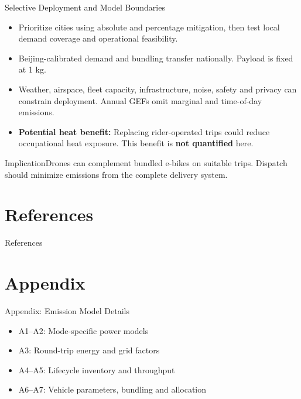 \documentclass[9pt]{beamer}
\begin{document}
\begin{frame}{Selective Deployment and Model Boundaries}
\begin{itemize}
  \item Prioritize cities using absolute and percentage mitigation, then test local demand coverage and operational feasibility.
  \item Beijing-calibrated demand and bundling transfer nationally. Payload is fixed at 1 kg.
  \item Weather, airspace, fleet capacity, infrastructure, noise, safety and privacy can constrain deployment. Annual GEFs omit marginal and time-of-day emissions.
  \item \textbf{Potential heat benefit:} Replacing rider-operated trips could reduce occupational heat exposure. This benefit is \textbf{not quantified} here.
\end{itemize}
\begin{block}{Implication}Drones can complement bundled e-bikes on suitable trips. Dispatch should minimize emissions from the complete delivery system.\end{block}
\end{frame}

\section{References}

\begin{frame}[allowframebreaks]{References}
  \printbibliography
\end{frame}


\appendix
\AtBeginSection[]{}
\section*{Appendix}
\begin{frame}{Appendix: Emission Model Details}
\begin{itemize}
\item A1--A2: Mode-specific power models
\item A3: Round-trip energy and grid factors
\item A4--A5: Lifecycle inventory and throughput
\item A6--A7: Vehicle parameters, bundling and allocation
\end{itemize}
\end{frame}
\end{document}
